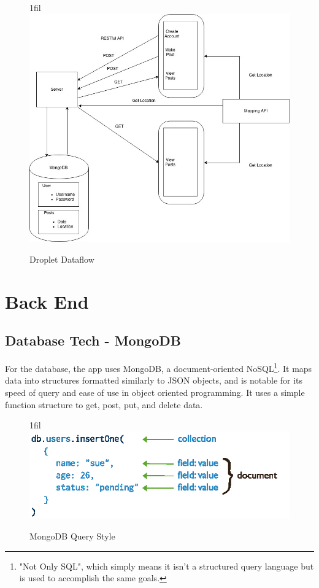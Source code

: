 \documentclass[draftclsnofoot, onecolumn, letterpaper,10pt,compsoc]{IEEEtran}
\makeatletter
\newcommand*{\centerfloat}{%
  \parindent \z@
  \leftskip \z@ \@plus 1fil \@minus \textwidth
  \rightskip\leftskip
  \parfillskip \z@skip}
\newcommand*{\centerfloat}{%
  \parindent \z@
  \leftskip \z@ \@plus 1fil \@minus \textwidth
  \rightskip\leftskip
  \parfillskip \z@skip}
\makeatother
\begin{document}
\begin{figure}[H]
    \centerfloat
    \includegraphics[scale=.6]{images/DropletDataFlow.jpg}
    \caption{Droplet Dataflow}
    \label{fig:my_label}
\end{figure}

\newpage
\section{Back End}

\subsection{Database Tech - MongoDB}

For the database, the app uses MongoDB, a document-oriented NoSQL\footnote{"Not Only SQL", which simply means it isn't a structured query language but is used to accomplish the same goals.}. It maps data into structures formatted similarly to JSON objects, and is notable for its speed of query and ease of use in object oriented programming. It uses a simple function structure to get, post, put, and delete data.

\begin{figure}[H]
    \centerfloat
    \includegraphics[scale=.8]{images/mongodb.jpg}
    \caption{MongoDB Query Style}
    \label{fig:my_label}
\end{figure}
\end{document}
